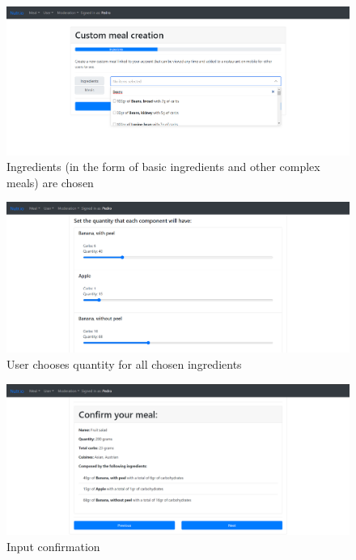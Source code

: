 \begin{figure}[H]
    \begin{center}
        \includegraphics[scale=0.4]{_figures/custom-2.png}
        \caption{Ingredients (in the form of basic ingredients and other complex meals) are chosen}
    \end{center}
\end{figure}

\begin{figure}[H]
    \begin{center}
        \includegraphics[scale=0.4]{_figures/custom-3.png}
        \caption{User chooses quantity for all chosen ingredients}
    \end{center}
\end{figure}

\begin{figure}[H]
    \begin{center}
        \includegraphics[scale=0.4]{_figures/custom-4.png}
        \caption{Input confirmation}
    \end{center}
\end{figure}

